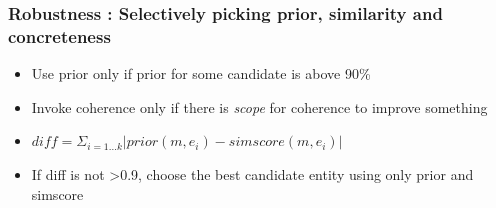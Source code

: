 \begin{frame}
\frametitle{Robustness : Selectively picking prior, similarity and concreteness}
\begin{itemize}
 \item Use prior only if prior for some candidate is above 90\% \bigskip
 \item Invoke coherence only if there is \emph{scope} for coherence to improve something \bigskip
 \item $diff = \Sigma_{i=1...k}|prior(m, e_i) - simscore(m, e_i)|$ \bigskip
 \item If diff is not \textgreater  0.9, choose the best candidate entity using only prior and simscore \bigskip
\end{itemize}
\end{frame}